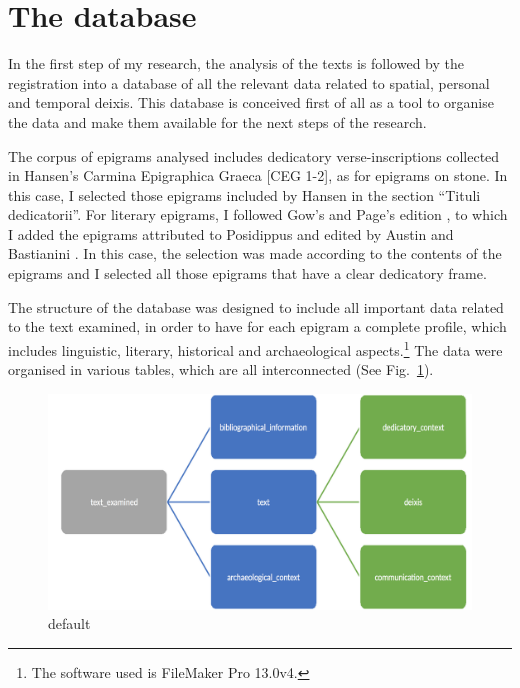 \documentclass[amsthm,ebook]{saparticle}
\begin{document}
\section{The database}


\noindent In the first step of my research, the analysis of the texts is followed by the registration into a database of all the
relevant data related to spatial, personal and temporal deixis. This database is conceived first of all as a tool to
organise the data and make them available for the next steps of the research.

The corpus of epigrams analysed includes dedicatory verse-inscriptions collected in Hansen's Carmina Epigraphica Graeca
[CEG 1-2], as for epigrams on stone. In this case, I selected those epigrams included by Hansen in the section ``Tituli
dedicatorii''. For literary epigrams, I followed Gow's and Page's edition \citep{gow_greek_1965}, to which I added
the epigrams attributed to Posidippus and edited by Austin and Bastianini \citep{austin_posidippi_2002}. In this case, the
selection was made according to the contents of the epigrams and I selected all those epigrams that have a clear
dedicatory frame.

The structure of the database was designed to include all important data related to the text examined, in order to have
for each epigram a complete profile, which includes linguistic, literary, historical and archaeological
aspects.\footnote{ The software used is FileMaker Pro 13.0v4.} The data were organised in various tables, which are all interconnected (See Fig.~\ref{fig:1}). 

\begin{figure}[!bp]
\centering
 \includegraphics[width=\columnwidth]{schema.png}
\caption{default}
\label{fig:1}
\end{figure}
\end{document}
